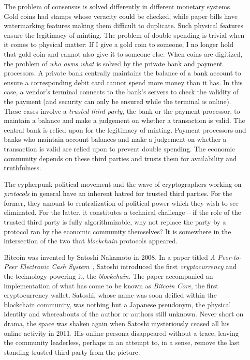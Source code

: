 The problem of consensus is solved differently in different monetary systems. Gold
coins had stamps whose veracity could be checked, while paper bills have watermarking
features making them difficult to duplicate. Such physical features ensure the
legitimacy of minting. The problem of double spending is trivial when it comes to
physical matter: If I give a
gold coin to someone, I no longer hold that gold coin and cannot also give it to
someone else. When coins are digitized, the problem of \emph{who owns what}
is solved by the private bank and payment processors.
A private bank centrally maintains the balance of a bank account to ensure a
corresponding debit card cannot spend more money than it has. In this case, a
vendor's terminal connects to the bank's servers to check the validity of the
payment (and security can only be ensured while the terminal is online). These
cases involve a \emph{trusted third party}, the
bank or the payment processor, to maintain a balance and make a judgement on
whether a transaction is valid. The central bank is relied upon for the
legitimacy of minting. Payment processors and banks who maintain account
balances and make a judgement on whether a transaction is valid are relied upon
to prevent double spending. The economic community depends on these third
parties and trusts them for availability and truthfulness.

The cypherpunk political movement and the wave of
cryptographers working on \emph{protocols} in general have an inherent hatred
for trusted third parties. For the former, they amount to
centralization of political power which they wish to see eliminated. For the
latter, it constitutes a technical challenge -- if the role of the trusted
third party is fully algorithmizable, why not replace the party by a protocol
ran by the economic community themselves? It is somewhere in the intersection of the
two that \emph{blockchain} protocols appeared.

Bitcoin was invented by Satoshi Nakamoto
in 2008. In a paper titled
\emph{A Peer-to-Peer Electronic Cash System}~\cite{bitcoin}, Satoshi introduced
the first \emph{cryptocurrency} and the technology powering it, the
\emph{blockchain}. The paper accompanied an implementation of what has come to
be known as \emph{Bitcoin Core}, the first cryptocurrency
wallet. Satoshi, whose name was soon deified within
the blockchain community, was nothing but a Japanese pseudonym, the
physical identity and whereabouts of the author or authors still unknown. Never
short on drama, the space was shaken again when Satoshi mysteriously ceased
all his online activity in 2011.
His online persona disappeared without a trace, leaving the community leaderless, perhaps in an attempt
to, in a sense, remove the last standing trusted third party from the picture.

